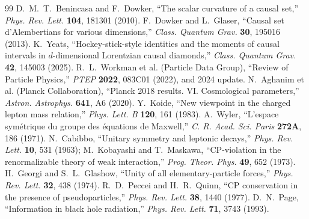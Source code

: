 \documentclass[11pt]{article}
\begin{document}
\begin{thebibliography}{99}
 D.~M.~T.~Benincasa and F.~Dowker, ``The scalar curvature of a causal set,'' \emph{Phys. Rev. Lett.} \textbf{104}, 181301 (2010).
 F.~Dowker and L.~Glaser, ``Causal set d'Alembertians for various dimensions,'' \emph{Class. Quantum Grav.} \textbf{30}, 195016 (2013).
 K.~Yeats, ``Hockey-stick-style identities and the moments of causal intervals in $d$-dimensional Lorentzian causal diamonds,'' \emph{Class. Quantum Grav.} \textbf{42}, 145003 (2025).
 R.~L.~Workman et al. (Particle Data Group), ``Review of Particle Physics,'' \emph{PTEP} \textbf{2022}, 083C01 (2022), and 2024 update.
 N.~Aghanim et al. (Planck Collaboration), ``Planck 2018 results. VI. Cosmological parameters,'' \emph{Astron. Astrophys.} \textbf{641}, A6 (2020).
 Y.~Koide, ``New viewpoint in the charged lepton mass relation,'' \emph{Phys. Lett. B} \textbf{120}, 161 (1983).
 A.~Wyler, ``L'espace sym\'etrique du groupe des \'equations de Maxwell,'' \emph{C. R. Acad. Sci. Paris} \textbf{272A}, 186 (1971).
 N.~Cabibbo, ``Unitary symmetry and leptonic decays,'' \emph{Phys. Rev. Lett.} \textbf{10}, 531 (1963); M.~Kobayashi and T.~Maskawa, ``CP-violation in the renormalizable theory of weak interaction,'' \emph{Prog. Theor. Phys.} \textbf{49}, 652 (1973).
 H.~Georgi and S.~L.~Glashow, ``Unity of all elementary-particle forces,'' \emph{Phys. Rev. Lett.} \textbf{32}, 438 (1974).
 R.~D.~Peccei and H.~R.~Quinn, ``CP conservation in the presence of pseudoparticles,'' \emph{Phys. Rev. Lett.} \textbf{38}, 1440 (1977).
 D.~N.~Page, ``Information in black hole radiation,'' \emph{Phys. Rev. Lett.} \textbf{71}, 3743 (1993).
\end{thebibliography}
\end{document}
